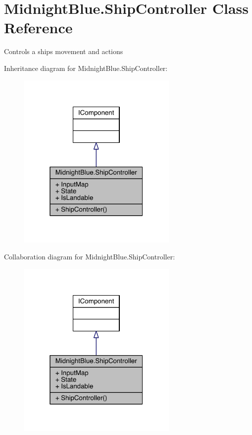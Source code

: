 \hypertarget{class_midnight_blue_1_1_ship_controller}{}\section{Midnight\+Blue.\+Ship\+Controller Class Reference}
\label{class_midnight_blue_1_1_ship_controller}


Controls a ships movement and actions  




Inheritance diagram for Midnight\+Blue.\+Ship\+Controller\+:\nopagebreak
\begin{figure}[H]
\begin{center}
\leavevmode
\includegraphics[width=220pt]{class_midnight_blue_1_1_ship_controller__inherit__graph}
\end{center}
\end{figure}


Collaboration diagram for Midnight\+Blue.\+Ship\+Controller\+:\nopagebreak
\begin{figure}[H]
\begin{center}
\leavevmode
\includegraphics[width=220pt]{class_midnight_blue_1_1_ship_controller__coll__graph}
\end{center}
\end{figure}
